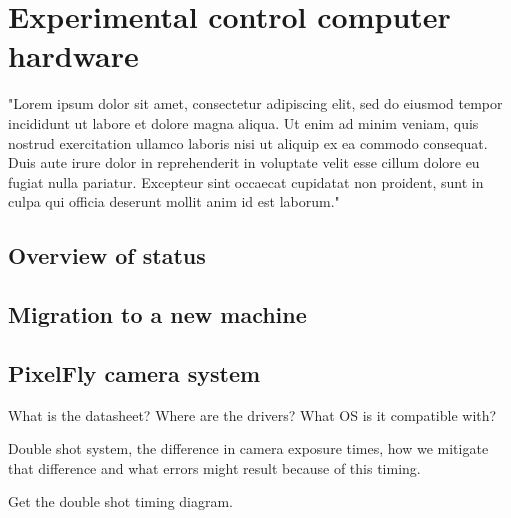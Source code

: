 \chapter{Experimental control computer hardware}
"Lorem ipsum dolor sit amet, consectetur adipiscing elit, sed do eiusmod tempor incididunt ut labore et dolore magna aliqua. Ut enim ad minim veniam, quis nostrud exercitation ullamco laboris nisi ut aliquip ex ea commodo consequat. Duis aute irure dolor in reprehenderit in voluptate velit esse cillum dolore eu fugiat nulla pariatur. Excepteur sint occaecat cupidatat non proident, sunt in culpa qui officia deserunt mollit anim id est laborum."

\section{Overview of status}

\section{Migration to a new machine}

\section{PixelFly camera system}

What is the datasheet?
Where are the drivers?
What OS is it compatible with?

Double shot system, the difference in camera exposure times, how we mitigate that difference and what errors might result because of this timing.

Get the double shot timing diagram.